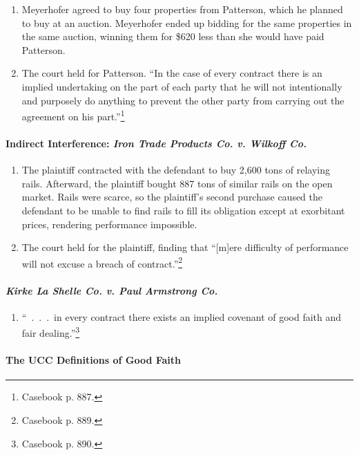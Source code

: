 \begin{enumerate}
    \item Meyerhofer agreed to buy four properties from Patterson, which he 
    planned to buy at an auction. Meyerhofer ended up bidding for the same 
    properties in the same auction, winning them for \$620 less than she would 
    have paid Patterson.
    \item The court held for Patterson. ``In the case of every contract there 
    is an implied undertaking on the part of each party that he will not 
    intentionally and purposely do anything to prevent the other party from 
    carrying out the agreement on his part.''\footnote{Casebook p. 887.}
\end{enumerate}

\paragraph{Indirect Interference: \emph{Iron Trade Products Co. v. Wilkoff 
Co.}}

\begin{enumerate}
    \item The plaintiff contracted with the defendant to buy 2,600 tons of 
    relaying rails. Afterward, the plaintiff bought 887 tons of similar rails 
    on the open market. Rails were scarce, so the plaintiff's second purchase 
    caused the defendant to be unable to find rails to fill its obligation 
    except at exorbitant prices, rendering performance impossible.
    \item The court held for the plaintiff, finding that ``[m]ere difficulty 
    of performance will not excuse a breach of contract.''\footnote{Casebook 
    p. 889.}
\end{enumerate}

\paragraph{\emph{Kirke La Shelle Co. v. Paul Armstrong Co.}}

\begin{enumerate}
    \item ``~.~.~.~in every contract there exists an implied covenant of good 
    faith and fair dealing.''\footnote{Casebook p. 890.}
\end{enumerate}

\paragraph{The UCC Definitions of Good Faith}

